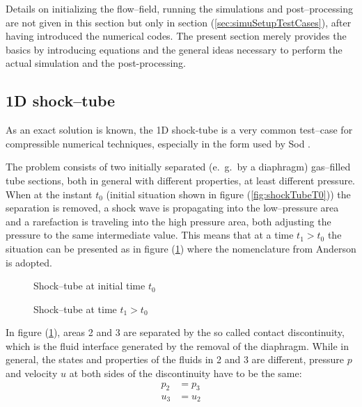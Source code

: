 \documentclass{report}
\begin{document}
Details on initializing the flow--field, running the simulations and post--processing are not given in this section but only in section (\ref{sec:simuSetupTestCases}), after having introduced the numerical codes. The present section merely provides the basics by introducing equations and the general ideas necessary to perform the actual simulation and the post-processing.

\subsection{1D shock--tube}
\label{sec:TestCases_1DshockTube}
As an exact solution is known, the 1D shock-tube is a very common test--case for compressible numerical techniques, especially in the form used by Sod \cite{Sod1978}.

 The problem consists of two initially separated (e.\ g.\ by a diaphragm) gas--filled tube sections, both in general with different properties, at least different pressure. When at the instant $t_0$ (initial situation shown in figure (\ref{fig:shockTubeT0})) the separation is removed, a shock wave is propagating into the low--pressure area and a rarefaction is traveling into the high pressure area, both adjusting the pressure to the same intermediate value. This means that at a time $t_1>t_0$ the situation can be presented as in figure (\ref{fig:shockTubeT1}) where the nomenclature from Anderson \cite{Anderson2002} is adopted.

\begin{figure}[h]
    \centering
            
      \caption{Shock--tube at initial time $t_0$}
      \label{fig:shockTubeT0}
\vspace*{0.3cm}
      
      \caption{Shock--tube at time $t_1>t_0$}
      \label{fig:shockTubeT1}
\end{figure}

In figure (\ref{fig:shockTubeT1}), areas 2 and 3 are separated by the so called contact discontinuity, which is the fluid interface generated by the removal of the diaphragm. While in general, the states and properties of the fluids in 2 and 3 are different, pressure $p$ and velocity $u$ at both sides of the discontinuity have to be the same:
\begin{equation}
\begin{split}
\label{eq:condCD}
p_2&=p_3\\
u_3&=u_2
\end{split}
\end{equation}
\end{document}

